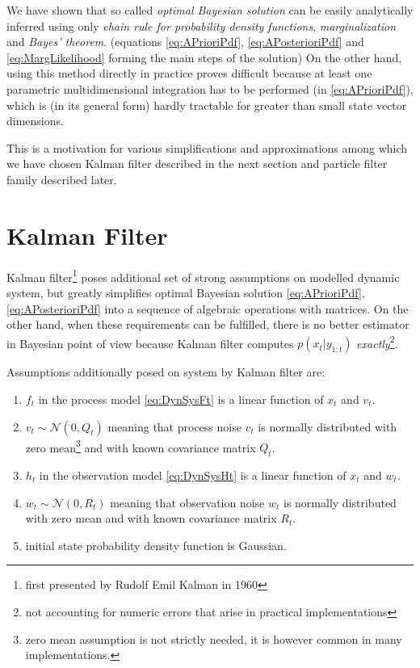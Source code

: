 \documentclass[a4paper,12pt,oneside]{report}
\newcommand{\pdf}{probability density function}
\newcommand{\pdfs}{probability density functions}
\begin{document}
We have shown that so called \emph{optimal Bayesian solution}\cite{AruMasGor:02} can be easily
analytically inferred using only \emph{chain rule for {\pdfs}}, \emph{marginalization} and
\emph{Bayes' theorem}. (equations \eqref{eq:APrioriPdf}, \eqref{eq:APosterioriPdf} and
\eqref{eq:MargLikelihood} forming the main steps of the solution) On the other hand, using this
method directly in practice proves difficult because at least one parametric multidimensional
integration has to be performed (in \eqref{eq:APrioriPdf}), which is (in its general form) hardly
tractable for greater than small state vector dimensions.

This is a motivation for various simplifications and approximations among which we have chosen
Kalman filter described in the next section and particle filter family described later.

\section{Kalman Filter}

Kalman filter\footnote{first presented by Rudolf Emil Kalman in 1960} poses additional set of strong
assumptions on modelled dynamic system, but greatly
simplifies optimal Bayesian solution \eqref{eq:APrioriPdf}, \eqref{eq:APosterioriPdf} into a
sequence of algebraic operations with matrices. On the other hand, when these requirements can be
fulfilled, there is no better estimator in Bayesian point of view because Kalman filter computes
\(p(x_t | y_{1:t})\) \emph{exactly}\footnote{not accounting for numeric errors that arise in
practical implementations}.

Assumptions additionally posed on system by Kalman filter are: %
\begin{enumerate}
	\item \(f_t\) in the process model \eqref{eq:DynSysFt} is a linear function of \(x_t\) and
	\(v_t\).
	\item \(v_t \sim \mathcal{N}(0, Q_t)\) meaning that process noise \(v_t\) is normally
	distributed with zero mean\footnote{zero mean assumption is not strictly needed, it is however
	common in many implementations.} and with known covariance matrix \(Q_t\).
	\item \(h_t\) in the observation model \eqref{eq:DynSysHt} is a linear function of \(x_t\) and
	\(w_t\).
	\item \(w_t \sim \mathcal{N}(0, R_t)\) meaning that observation noise \(w_t\) is normally distributed
	with zero mean and with known covariance matrix \(R_t\).
	\item initial state {\pdf} is Gaussian.
\end{enumerate}
\end{document}
